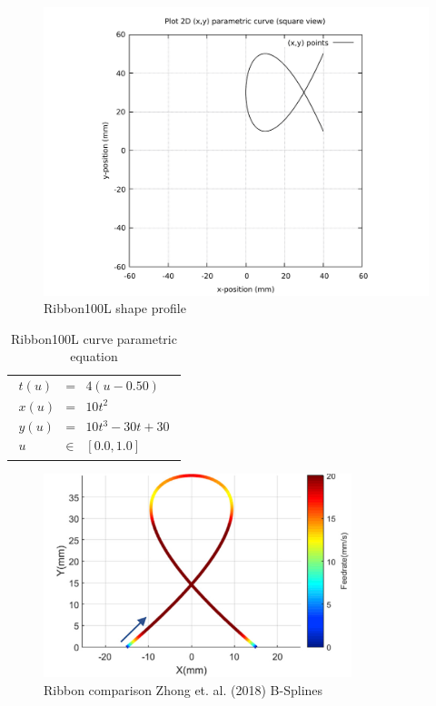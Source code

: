 \begin{figure}
	\caption{Ribbon100L shape profile}
	\label{Ribbon100L-curve-plot-BW.pdf}
	\centering
	\includegraphics[width=1.20\textwidth]{Chap3/curve-shape/curves/Ribbon100L-curve-plot-BW.pdf} 
\end{figure}

\begin{table}[ht]
\begin{center}
\begin{tabular}{ p{16.0cm} }
\caption{Ribbon100L curve parametric equation}
\begin{eqnarray}
	t(u) & = & 4(u - 0.50) \nonumber \\
	x(u) & = & 10t^2 \nonumber \\   
	y(u) & = & 10t^3 - 30t + 30 \nonumber \\
	u & \in & [0.0, 1.0] \nonumber
\end{eqnarray}
\end{tabular}
\end{center}
\end{table}


\clearpage
\pagebreak

\begin{figure}
	\caption{Ribbon comparison Zhong et. al. (2018) B-Splines}
	\label{Comparison-Ribbon-Zhong-et-al(2018)}
	\centering 
	\includegraphics[width=0.80\textwidth]{Images/Chap3/Comparison-Ribbon-Zhong-et-al-2018.png} 
\end{figure}

